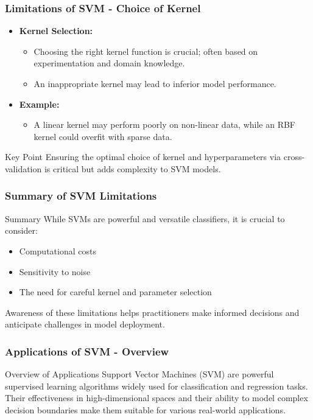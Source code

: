 \documentclass{beamer}
\begin{document}
\begin{frame}[fragile]
    \frametitle{Limitations of SVM - Choice of Kernel}
    \begin{itemize}
        \item \textbf{Kernel Selection:} 
        \begin{itemize}
            \item Choosing the right kernel function is crucial; often based on experimentation and domain knowledge.
            \item An inappropriate kernel may lead to inferior model performance.
        \end{itemize}
        \item \textbf{Example:} 
        \begin{itemize}
            \item A linear kernel may perform poorly on non-linear data, while an RBF kernel could overfit with sparse data.
        \end{itemize}
    \end{itemize}
    
    \begin{block}{Key Point}
        Ensuring the optimal choice of kernel and hyperparameters via cross-validation is critical but adds complexity to SVM models.
    \end{block}
\end{frame}

\begin{frame}[fragile]
    \frametitle{Summary of SVM Limitations}
    \begin{block}{Summary}
        While SVMs are powerful and versatile classifiers, it is crucial to consider:
        \begin{itemize}
            \item Computational costs
            \item Sensitivity to noise
            \item The need for careful kernel and parameter selection
        \end{itemize}
        Awareness of these limitations helps practitioners make informed decisions and anticipate challenges in model deployment.
    \end{block}
\end{frame}

\begin{frame}[fragile]
    \frametitle{Applications of SVM - Overview}
    \begin{block}{Overview of Applications}
        Support Vector Machines (SVM) are powerful supervised learning algorithms widely used for classification and regression tasks. Their effectiveness in high-dimensional spaces and their ability to model complex decision boundaries make them suitable for various real-world applications.
    \end{block}
\end{frame}
\end{document}
